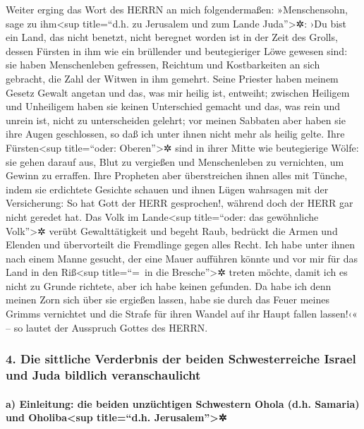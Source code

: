 Weiter erging das Wort des HERRN an mich folgendermaßen:
»Menschensohn, sage zu ihm\textless sup title=``d.h. zu
Jerusalem und zum Lande Juda''\textgreater✲: ›Du bist ein Land, das
nicht benetzt, nicht beregnet worden ist in der Zeit des Grolls,
dessen Fürsten in ihm wie ein brüllender und
beutegieriger Löwe gewesen sind: sie haben Menschenleben gefressen,
Reichtum und Kostbarkeiten an sich gebracht, die Zahl der Witwen in ihm
gemehrt. Seine Priester haben meinem Gesetz Gewalt
angetan und das, was mir heilig ist, entweiht; zwischen Heiligem und
Unheiligem haben sie keinen Unterschied gemacht und das, was rein und
unrein ist, nicht zu unterscheiden gelehrt; vor meinen Sabbaten aber
haben sie ihre Augen geschlossen, so daß ich unter ihnen nicht mehr als
heilig gelte. Ihre Fürsten\textless sup title=``oder:
Oberen''\textgreater✲ sind in ihrer Mitte wie beutegierige Wölfe: sie
gehen darauf aus, Blut zu vergießen und Menschenleben zu vernichten, um
Gewinn zu erraffen. Ihre Propheten aber überstreichen
ihnen alles mit Tünche, indem sie erdichtete Gesichte schauen und ihnen
Lügen wahrsagen mit der Versicherung: So hat Gott der HERR gesprochen!,
während doch der HERR gar nicht geredet hat. Das Volk im
Lande\textless sup title=``oder: das gewöhnliche Volk''\textgreater✲
verübt Gewalttätigkeit und begeht Raub, bedrückt die Armen und Elenden
und übervorteilt die Fremdlinge gegen alles Recht. Ich
habe unter ihnen nach einem Manne gesucht, der eine Mauer aufführen
könnte und vor mir für das Land in den Riß\textless sup title=``=~in die
Bresche''\textgreater✲ treten möchte, damit ich es nicht zu Grunde
richtete, aber ich habe keinen gefunden. Da habe ich denn
meinen Zorn sich über sie ergießen lassen, habe sie durch das Feuer
meines Grimms vernichtet und die Strafe für ihren Wandel auf ihr Haupt
fallen lassen!‹« -- so lautet der Ausspruch Gottes des HERRN.

\hypertarget{die-sittliche-verderbnis-der-beiden-schwesterreiche-israel-und-juda-bildlich-veranschaulicht}{%
\subsubsection{4. Die sittliche Verderbnis der beiden Schwesterreiche
Israel und Juda bildlich
veranschaulicht}\label{die-sittliche-verderbnis-der-beiden-schwesterreiche-israel-und-juda-bildlich-veranschaulicht}}

\hypertarget{a-einleitung-die-beiden-unzuxfcchtigen-schwestern-ohola-d.h.-samaria-und-oholibasup-titled.h.-jerusalem}{%
\paragraph{a) Einleitung: die beiden unzüchtigen Schwestern Ohola (d.h.
Samaria) und Oholiba\textless sup title=``d.h.
Jerusalem''\textgreater✲}\label{a-einleitung-die-beiden-unzuxfcchtigen-schwestern-ohola-d.h.-samaria-und-oholibasup-titled.h.-jerusalem}}

